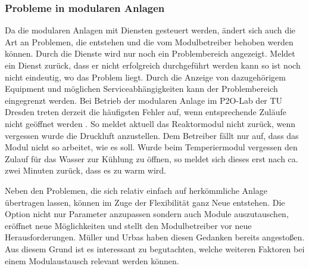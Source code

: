 \subsubsection{Probleme in modularen Anlagen}
\label{Probleme-modulare-Anlage}
Da die modularen Anlagen mit Diensten gesteuert werden, ändert sich auch die Art an Problemen, die entstehen und die vom Modulbetreiber behoben werden können. Durch die Dienste wird nur noch ein Problembereich angezeigt. Meldet ein Dienst zurück, dass er nicht erfolgreich durchgeführt werden kann so ist noch nicht eindeutig, wo das Problem liegt. Durch die Anzeige von dazugehörigem Equipment und möglichen Serviceabhängigkeiten kann der Problembereich eingegrenzt werden. Bei Betrieb der modularen Anlage im P2O-Lab der TU Dresden treten derzeit die häufigsten Fehler auf, wenn entsprechende Zuläufe nicht geöffnet werden . So meldet aktuell das Reaktormodul nicht zurück, wenn vergessen wurde die Druckluft anzustellen. Dem Betreiber fällt nur auf, dass das Modul nicht so arbeitet, wie es soll. Wurde beim Temperiermodul vergessen den Zulauf für das Wasser zur Kühlung zu öffnen, so meldet sich dieses erst nach ca. zwei Minuten zurück, dass es zu warm wird.

Neben den Problemen, die sich relativ einfach auf herkömmliche Anlage übertragen lassen, können im Zuge der Flexibilität ganz Neue entstehen. Die Option nicht nur Parameter anzupassen sondern auch Module auszutauschen, eröffnet neue Möglichkeiten und stellt den Modulbetreiber vor neue Herausforderungen. Müller und Urbas \cite{}  haben diesen Gedanken bereits angestoßen. Aus diesem Grund ist es interessant zu begutachten, welche weiteren Faktoren bei einem Modulaustausch relevant werden können.

